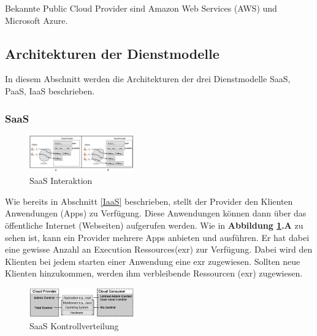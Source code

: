 Bekannte Public Cloud Provider sind Amazon Web Services (AWS) und Microsoft Azure. 



\subsection{Architekturen der Dienstmodelle}

In diesem Abschnitt werden die Architekturen der drei Dienstmodelle SaaS, PaaS, IaaS beschrieben.

\subsubsection{SaaS}\label{SaaS Architektur}

\begin{figure}[H]
    \centering
	\includegraphics[width=0.4\textwidth]{Images/SaaSInteraction}
	\caption{SaaS Interaktion \cite{Badger}}
	\label{SaaSInteraction}
\end{figure}
Wie bereits in Abschnitt \ref{IaaS} beschrieben, stellt der Provider den Klienten Anwendungen (\glqq Apps\grqq) zu Verfügung.
Diese Anwendungen können dann über das öffentliche Internet (Webseiten) aufgerufen werden.
Wie in \textbf{Abbildung \ref{SaaSInteraction}.A} zu sehen ist, kann ein Provider mehrere Apps anbieten und ausführen.
Er hat dabei eine gewisse Anzahl an \glqq Execution Ressources\grqq (exr) zur Verfügung. 
Dabei wird den Klienten bei jedem starten einer Anwendung eine exr zugewiesen. Sollten neue Klienten hinzukommen, werden ihm verbleibende Ressourcen (exr) zugewiesen. 

\begin{figure}[H]
    \centering
	\includegraphics[width=0.4\textwidth]{Images/SaaSControl}
	\caption{SaaS Kontrollverteilung \cite{Badger}}
	\label{SaaSControl}
\end{figure}

